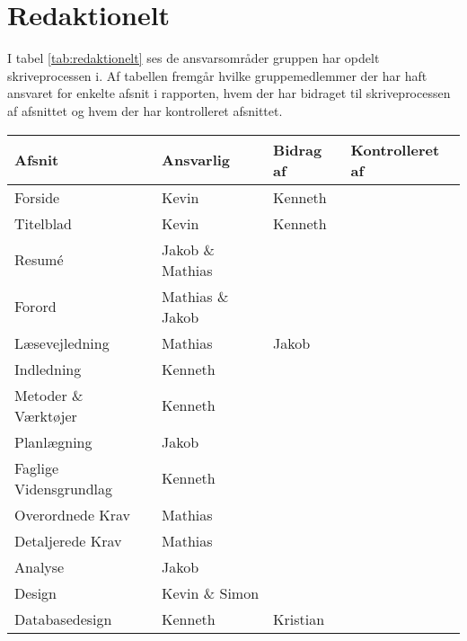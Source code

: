 \section{Redaktionelt}
I tabel \ref{tab:redaktionelt} ses de ansvarsområder gruppen har opdelt skriveprocessen i. Af tabellen fremgår hvilke gruppemedlemmer der har haft ansvaret for enkelte afsnit i rapporten, hvem der har bidraget til skriveprocessen af afsnittet og hvem der har kontrolleret afsnittet. 

\begin{table}[H] %
    \begin{tabularx}{\textwidth}{|>{\RaggedRight}p{7cm}|>{\RaggedRight}X|>{\RaggedRight}X|>{\RaggedRight}X|}
        \hline
        \textbf{Afsnit}                     &  \textbf{Ansvarlig}  & \textbf{Bidrag af} & \textbf{Kontrolleret af}\\
        \hline
        Forside                             & Kevin & Kenneth &  \\
        \hline
        Titelblad                           & Kevin & Kenneth &  \\
        \hline
        Resumé                              & Jakob \& Mathias &  &  \\
        \hline
        Forord                              & Mathias \& Jakob &  &  \\
        \hline
        Læsevejledning                      & Mathias & Jakob &  \\
        \hline
        Indledning                          & Kenneth &  &  \\
        \hline
        Metoder \& Værktøjer                & Kenneth &  &  \\
        \hline
        Planlægning                         & Jakob &  &  \\
        \hline
        Faglige Vidensgrundlag              & Kenneth &  &  \\
        \hline
        Overordnede Krav                    & Mathias &  &  \\
        \hline
        Detaljerede Krav                    & Mathias &  &  \\
        \hline
        Analyse                             & Jakob &  &  \\
        \hline
        Design                              & Kevin \& Simon &  &  \\
        \hline
        Databasedesign                      & Kenneth & Kristian &  \\

\end{tabularx}
\end{table}
